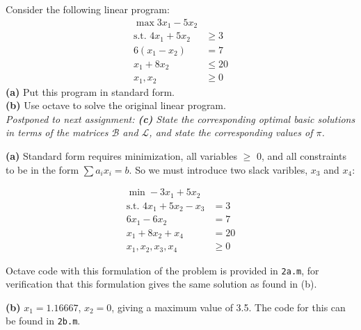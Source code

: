 \documentclass[fleqn]{homework}
\begin{document}
  \begin{problem}{2}
    \begin{question}
      Consider the following linear program:
      \begin{align*}
        \max 3x_1 - 5x_2 & \\
        \text{s.t.  } 4x_1 + 5x_2 &\ge 3 \\
        6(x_1 - x_2) &= 7 \\
        x_1 + 8x_2 &\le 20 \\
        x_1, x_2 &\ge 0
      \end{align*}
      \textbf{(a)} Put this program in standard form.\\
      \textbf{(b)} Use octave to solve the original linear program.\\
      \textit{Postponed to next assignment: \textbf{(c)} State the corresponding
        optimal basic solutions in terms of the matrices $\mathcal{B}$ and
        $\mathcal{L}$, and state the corresponding values of $\pi$.}
    \end{question}

    \textbf{(a)} Standard form requires minimization, all variables $\geq$ 0,
    and all constraints to be in the form $\sum a_i x_i = b$.  So we must
    introduce two slack varibles, $x_3$ and $x_4$:

    \begin{align*}
      \min -3x_1 + 5x_2 & \\
      \text{s.t. } 4x_1 + 5x_2 - x_3 &= 3 \\
      6x_1 - 6x_2 &= 7 \\
      x_1 + 8x_2 + x_4 &= 20 \\
      x_1, x_2, x_3, x_4 &\geq 0
    \end{align*}

    Octave code with this formulation of the problem is provided in
    \texttt{2a.m}, for verification that this formulation gives the same
    solution as found in (b).

    \textbf{(b)} $x_1 = 1.16667$, $x_2 = 0$, giving a maximum value of 3.5.  The
    code for this can be found in \texttt{2b.m}.
  \end{problem}
\end{document}
